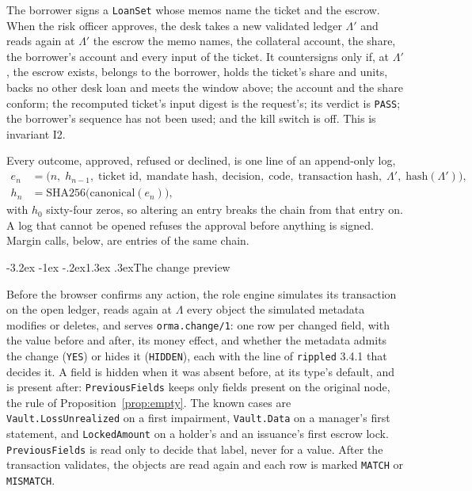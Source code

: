 \documentclass[11pt]{article}
\makeatletter
\renewcommand\subsection{\@startsection{subsection}{2}{\z@}%
  {-3.2ex \@plus -1ex \@minus -.2ex}{1.3ex \@plus .3ex}{\normalfont\large\bfseries}}
\theoremstyle{orma}
\theoremstyle{ormaupright}
\makeatother
\begin{document}
The borrower signs a \texttt{LoanSet} whose memos name the ticket and the escrow. When the
risk officer approves, the desk takes a new validated ledger $\Lambda'$ and reads again at
$\Lambda'$ the escrow the memo names, the collateral account, the share, the borrower's
account and every input of the ticket. It countersigns only if, at $\Lambda'$, the escrow
exists, belongs to the borrower, holds the ticket's share and units, backs no other desk
loan and meets the window above; the account and the share conform; the recomputed ticket's
input digest is the request's; its verdict is \texttt{PASS}; the borrower's sequence has not
been used; and the kill switch is off. This is invariant I2.

Every outcome, approved, refused or declined, is one line of an append-only log,
\begin{align}
  e_n &= \big( n,\; h_{n-1},\; \text{ticket id},\; \text{mandate hash},\; \text{decision},\;
  \text{code},\; \text{transaction hash},\; \Lambda',\; \mathrm{hash}(\Lambda') \big),
  \\[4pt]
  h_n &= \mathrm{SHA256}\big( \mathrm{canonical}(e_n) \big),
\end{align}
with $h_0$ sixty-four zeros, so altering an entry breaks the chain from that entry on. A log
that cannot be opened refuses the approval before anything is signed. Margin calls, below,
are entries of the same chain.

\subsection{The change preview}

Before the browser confirms any action, the role engine simulates its transaction on the
open ledger, reads again at $\Lambda$ every object the simulated metadata modifies or
deletes, and serves \texttt{orma.change/1}: one row per changed field, with the value before
and after, its money effect, and whether the metadata admits the change (\texttt{YES}) or
hides it (\texttt{HIDDEN}), each with the line of \texttt{rippled} 3.4.1 that decides it. A
field is hidden when it was absent before, at its type's default, and is present after:
\texttt{PreviousFields} keeps only fields present on the original node, the rule of
Proposition~\ref{prop:empty}. The known cases are \texttt{Vault.LossUnrealized} on a first
impairment, \texttt{Vault.Data} on a manager's first statement, and \texttt{LockedAmount}
on a holder's and an issuance's first escrow lock. \texttt{PreviousFields} is read only to
decide that label, never for a value. After the transaction validates, the objects are read
again and each row is marked \texttt{MATCH} or \texttt{MISMATCH}.
\end{document}
